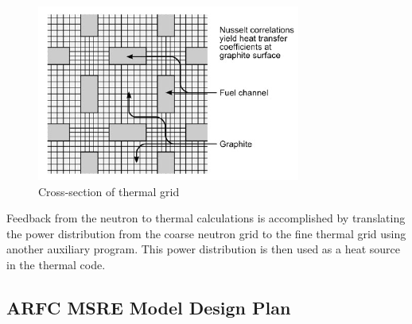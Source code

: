 \documentclass{article}
\let\Oldsubsection\subsection
\renewcommand{\subsection}{\FloatBarrier\Oldsubsection}
\begin{document}
\begin{figure}[htpb]
  \centering
  \includegraphics[max height=.5\textheight,max width=\textwidth,keepaspectratio]{cross-section-of-thermal-grid.png}
  \caption{Cross-section of thermal grid \cite{kophazi_development_2009}}
  \label{fig:thermal-grid}
\end{figure}

Feedback from the neutron to thermal calculations is accomplished by translating
the power distribution from the coarse neutron grid to the fine thermal grid
using another auxiliary program. This power distribution is then used as a heat
source in the thermal code.

\subsection{ARFC \gls{MSRE} Model Design Plan}
\end{document}
